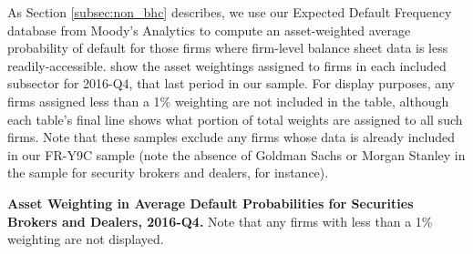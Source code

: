As Section \ref{subsec:non_bhc} describes, we use our Expected Default Frequency database from Moody's Analytics to compute an asset-weighted average probability of default for those firms where firm-level balance sheet data is less readily-accessible.  show the asset weightings assigned to firms in each included subsector for 2016-Q4, that last period in our sample. For display purposes, any firms assigned less than a 1\% weighting are not included in the table, although each table's final line shows what portion of total weights are assigned to all such firms. Note that these samples exclude any firms whose data is already included in our FR-Y9C sample (note the absence of Goldman Sachs or Morgan Stanley in the sample for security brokers and dealers, for instance).

\begin{table} [H]\centering
\def\sym#1{\ifmmode^{#1}\else\(^{#1}\)\fi}

\caption[]{\textbf{Asset Weighting in Average Default Probabilities for Securities Brokers and Dealers, 2016-Q4.} Note that any firms with less than a 1\% weighting are not displayed.}\label{tab:sample_dealers}
\end{table}



